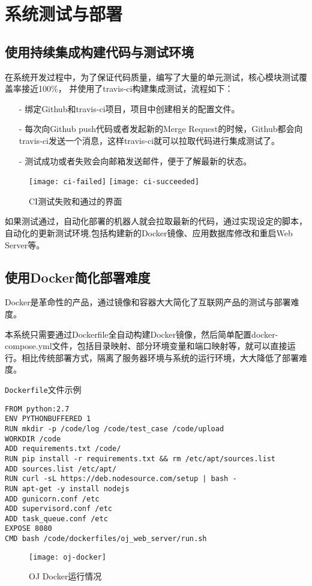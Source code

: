 \section{系统测试与部署}

\subsection{使用持续集成构建代码与测试环境}

在系统开发过程中，为了保证代码质量，编写了大量的单元测试，核心模块测试覆盖率接近100\%， 并使用了travis-ci构建集成测试，流程如下：

\begin{itemize}
    \item[-] 绑定Github和travis-ci项目，项目中创建相关的配置文件。
    \item[-] 每次向Github push代码或者发起新的Merge Request的时候，Github都会向travis-ci发送一个消息，这样travis-ci就可以拉取代码进行集成测试了。
    \item[-] 测试成功或者失败会向邮箱发送邮件，便于了解最新的状态。
\end{itemize}

\begin{figure}[H]
\centering
\texttt{[image: ci-failed]}
\texttt{[image: ci-succeeded]}
\caption{CI测试失败和通过的界面}
\end{figure}

如果测试通过，自动化部署的机器人就会拉取最新的代码，通过实现设定的脚本，自动化的更新测试环境,包括构建新的Docker镜像、应用数据库修改和重启Web Server等。

\subsection{使用Docker简化部署难度}
Docker是革命性的产品，通过镜像和容器大大简化了互联网产品的测试与部署难度。

本系统只需要通过Dockerfile全自动构建Docker镜像，然后简单配置docker-compose.yml文件，包括目录映射、部分环境变量和端口映射等，就可以直接运行。相比传统部署方式，隔离了服务器环境与系统的运行环境，大大降低了部署难度。

\texttt{Dockerfile}文件示例
\begin{verbatim}
FROM python:2.7
ENV PYTHONBUFFERED 1
RUN mkdir -p /code/log /code/test_case /code/upload
WORKDIR /code
ADD requirements.txt /code/
RUN pip install -r requirements.txt && rm /etc/apt/sources.list
ADD sources.list /etc/apt/
RUN curl -sL https://deb.nodesource.com/setup | bash -
RUN apt-get -y install nodejs
ADD gunicorn.conf /etc
ADD supervisord.conf /etc
ADD task_queue.conf /etc
EXPOSE 8080
CMD bash /code/dockerfiles/oj_web_server/run.sh
\end{verbatim}

\begin{figure}[H]
\centering
\texttt{[image: oj-docker]}
\caption{OJ Docker运行情况}
\end{figure}